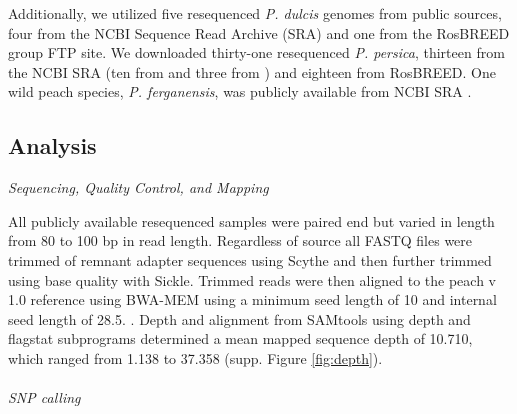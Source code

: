 \documentclass[12pt]{article}
\begin{document}
Additionally, we utilized five resequenced \emph{P. dulcis} genomes from public sources, four from \citealt{koepke2013comparative} 
the NCBI Sequence Read Archive (SRA) and one from the RosBREED group FTP site.
%
We downloaded thirty-one resequenced \emph{P. persica}, thirteen from the NCBI SRA (ten from \citealt{verde2013high} and three from \citealt{ahmad2011whole}) and eighteen from RosBREED.
%
One wild peach species, \emph{P. ferganensis}, was publicly available from NCBI SRA \citep{verde2013high}.\\
%
%
\subsection*{Analysis}
\emph{Sequencing, Quality Control, and Mapping}

All publicly available resequenced samples were paired end but varied in length from 80 to 100 bp in read length. 
%
Regardless of source all FASTQ files were trimmed of remnant adapter sequences using Scythe and then further trimmed using base quality with Sickle. 
%
%
%
Trimmed reads were then aligned to the peach v 1.0 reference using BWA-MEM using a minimum seed length of 10 and internal seed length of 28.5.
%
 \citep{li2013aligning}. 
%
Depth and alignment from SAMtools using depth and flagstat subprograms \citep{li2009sequence} determined a mean mapped sequence depth of 10.710, which ranged from 1.138 to 37.358 (supp. Figure \ref{fig:depth}).\\ %
%
%
\\
\emph{SNP calling}
\end{document}
